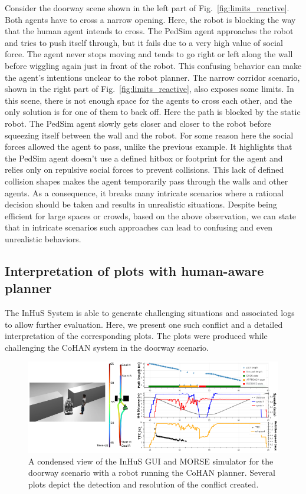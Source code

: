 Consider the doorway scene shown in the left part of Fig.~\ref{fig:limits_reactive}. Both agents have to cross a narrow opening. Here, the robot is blocking the way that the human agent intends to cross. The PedSim agent approaches the robot and tries to push itself through, but it fails due to a very high value of social force. The agent never stops moving and tends to go right or left along the wall before wiggling again just in front of the robot. 
This confusing behavior can make the agent's intentions unclear to the robot planner. 
The narrow corridor scenario, shown in the right part of Fig.~\ref{fig:limits_reactive}, also exposes some limits. In this scene, there is not enough space for the agents to cross each other,  and the only solution is for one of them to back off. Here the path is blocked by the static robot. The PedSim agent slowly gets closer and closer to the robot before squeezing itself between the wall and the robot. For some reason here the social forces allowed the agent to pass, unlike the previous example. It highlights that the PedSim agent doesn't use a defined hitbox or footprint for the agent and relies only on repulsive social forces to prevent collisions. This lack of defined collision shapes makes the agent temporarily pass through the walls and other agents. As a consequence, it breaks many intricate scenarios where a rational decision should be taken and results in unrealistic situations. Despite being efficient for large spaces or crowds, based on the above observation, we can state that in intricate scenarios such approaches can lead to confusing and even unrealistic behaviors.  

\subsection{Interpretation of plots with human-aware planner}

The InHuS System is able to generate challenging situations 
and associated logs to allow further evaluation.
Here, we present one such conflict and a detailed interpretation of the corresponding plots. The plots were produced while challenging the CoHAN system in the doorway scenario.

\begin{figure}
    \centering
    \includegraphics[width=1.0\linewidth]{images/Chapter6/test.pdf}
    
    \caption{
    A condensed view of the InHuS GUI and MORSE simulator for the doorway scenario with a robot running the CoHAN planner. Several plots depict the detection and resolution of the conflict created. 
    }
    \label{fig:cohan_passage_block}
    \vspace{-0.3cm}
\end{figure}


